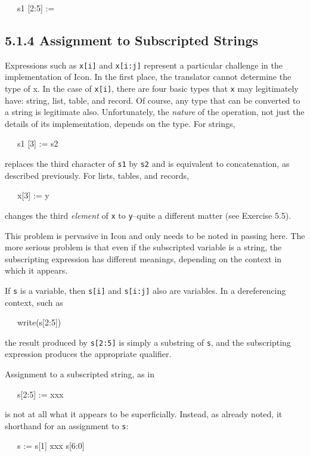 \ \ \ s1 [2:5] := {\textquotedbl}{\textquotedbl}

\subsection[5.1.4 Assignment to Subscripted Strings]{5.1.4 Assignment to Subscripted Strings}

Expressions such as \texttt{x[i]} and \texttt{x[i:j]} represent a
particular challenge in the implementation of Icon. In the first
place, the translator cannot determine the type of x. In the case of
\texttt{x[i]}, there are four basic types that \texttt{x} may
legitimately have: string, list, table, and record. Of course, any
type that can be converted to a string is legitimate
also. Unfortunately, the \textit{nature }of the operation, not just
the details of its implementation, depends on the type. For strings,

{\ttfamily\mdseries
\ \ \ s1 [3] := s2}

\noindent replaces the third character of \texttt{s1} by \texttt{s2}
and is equivalent to concatenation, as described previously.  For
lists, tables, and records,

{\ttfamily\mdseries
\ \ \ x[3] := y}

\noindent changes the third \textit{element }of \texttt{x} to
\texttt{y}{}--quite a different matter (see Exercise 5.5).

This problem is pervasive in Icon and only needs to be noted in
passing here. The more serious problem is that even if the subscripted
variable is a string, the subscripting expression has different
meanings, depending on the context in which it appears.

If \texttt{s} is a variable, then \texttt{s[i]} and \texttt{s[i:j]}
also are variables. In a dereferencing context, such as

{\ttfamily\mdseries
\ \ \ write(s[2:5])}

\noindent the result produced by \texttt{s[2:5]} is simply a substring
of \texttt{s}, and the subscripting expression produces the
appropriate qualifier.

Assignment to a subscripted string, as in

{\ttfamily\mdseries
\ \ \ s[2:5] := {\textquotedbl}xxx{\textquotedbl}}

\noindent is not at all what it appears to be superficially. Instead,
as already noted, it shorthand for an assignment to \texttt{s}:

{\ttfamily\mdseries
\ \ \ s := s[1] {\textbar}{\textbar} {\textquotedbl}xxx{\textquotedbl} {\textbar}{\textbar} s[6:0]}

